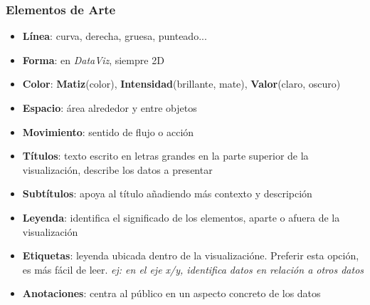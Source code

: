 \subsubsection{Elementos de Arte}
\begin{itemize}
    \item {\textbf{Línea}: curva, derecha, gruesa, punteado...}
    \item {\textbf{Forma}: en \textit{DataViz}, siempre 2D}
    \item {\textbf{Color}: \textbf{Matiz}(color), \textbf{Intensidad}(brillante, mate), \textbf{Valor}(claro, oscuro)}
    \item {\textbf{Espacio}: área alrededor y entre objetos}
    \item {\textbf{Movimiento}: sentido de flujo o acción}
    \item {\textbf{Títulos}: texto escrito en letras grandes en la parte superior de la visualización, describe los datos a presentar}
    \item {\textbf{Subtítulos}: apoya al título añadiendo más contexto y descripción}
    \item {\textbf{Leyenda}: identifica el significado de los elementos, aparte o afuera de la visualización}
    \item {\textbf{Etiquetas}: leyenda ubicada dentro de la visualizacióne. Preferir esta opción, es más fácil de leer. \textit{ej:  en el eje x/y, identifica datos en relación a otros datos}}
    \item {\textbf{Anotaciones}: centra al público en un aspecto concreto de los datos}
\end{itemize}

